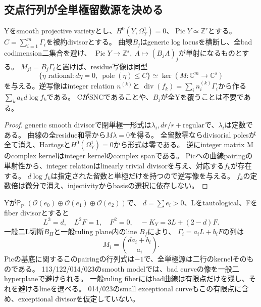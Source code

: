 \subsection{交点行列が全単極留数源を決める}
\begin{theorem}[曲線による全留数源]\label{thm:curve-residue-source}
Yをsmooth projective varietyとし、$H^0(Y,\Omega_Y^1)=0$、$\operatorname{Pic}Y\simeq\mathbb Z^r$とする。
$C=\sum_{i=1}^m\Gamma_i$を被約divisorとする。
曲線$B_j$はgeneric log locusを横断し、全bad codimension二集合を避け、
$\operatorname{Pic}Y\to\mathbb Z^s,\ A\mapsto(B_jA)_j$が単射になるものとする。
$M_{ji}=B_j\Gamma_i$と置けば、residue写像は同型
\begin{equation}
 \{\eta\text{ rational}:d\eta=0,\ \operatorname{pole}(\eta)\le C\}
       \simeq\ker(M:\mathbb C^m\to\mathbb C^s)              \label{eq:curve-residue-kernel}
\end{equation}
を与える。逆写像はinteger relation $n^{(k)}$と
$\operatorname{div}(f_k)=\sum_i n_i^{(k)}\Gamma_i$から作る$\sum_k a_kd\log f_k$である。
CがSNCであることや、$B_j$が全Yを覆うことは不要である。
\end{theorem}
\begin{proof}
generic smooth divisorで閉単極一形式は$\lambda_i,dr/r+\text{regular}$で、$\lambda_i$は定数である。
曲線の全residue和零から$M\lambda=0$を得る。
全留数零ならdivisorial polesが全て消え、Hartogsと$H^0(\Omega_Y^1)=0$から形式は零である。
逆にinteger matrix Mのcomplex kernelはinteger kernelのcomplex spanである。
Picへの曲線pairingの単射性から、integer relationはlinearly trivial divisorを与え、対応する$f_k$が存在する。
$d\log f_k$は指定された留数と単極だけを持つので逆写像を与える。
$f_k$の定数倍は微分で消え、injectivityからbasisの選択に依存しない。
\end{proof}

Yが$\mathbb P_{\mathbb P^1}(\mathcal O(e_0)\oplus\mathcal O(e_1)\oplus\mathcal O(e_2))$で、
$d=\sum e_i>0$、Lをtautological、Fをfiber divisorとすると
\[
 L^3=d,\quad L^2F=1,\quad F^2=0,\quad -K_Y=3L+(2-d)F.
\]
一般二L切断$B_H$と一般ruling plane内のline $B_f$により、
$\Gamma_i=a_iL+b_iF$の列は
\begin{equation}
 M_i=\binom{da_i+b_i}{a_i}.\label{eq:scroll-residue-matrix}
\end{equation}
Picの基底に関するこのpairingの行列式は$-1$で、全単極源は二行のkernelそのものである。
113/122/014/023のsmooth modelでは、bad curveの像を一般二hyperplaneで避けられる。
一般ruling fiberにはbad曲線は有限点だけを残し、それを避けるlineを選べる。
014/023のsmall exceptional curveもこの有限点に含め、exceptional divisorを仮定していない。

